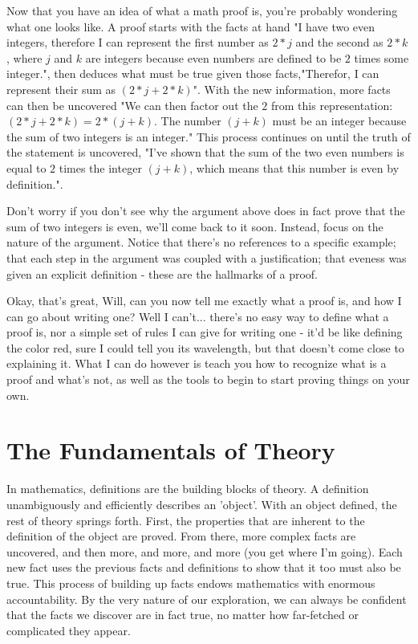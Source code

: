 \documentclass[a4paper,12pt]{article}
\begin{document}
Now that you have an idea of what a math proof is, you're probably wondering what one looks like. A proof starts with the facts at hand "I have two even integers, therefore I can represent the first number as  $2*j$ and the second as $2*k$, where $j$ and $k$ are integers because even numbers are defined to be $2$ times some integer.", then deduces what must be true given those facts,"Therefor, I can represent their sum as $(2*j + 2*k)$". With the new information, more facts can then be uncovered "We can then factor out the $2$ from this representation:  $(2*j + 2*k) = 2*(j + k)$. The number $(j + k)$ must be an integer because the sum of two integers is an integer." This process continues on until the truth of the statement is uncovered, "I've shown that the sum of the two even numbers is equal to $2$ times the integer $(j + k)$, which means that this number is even by definition.". 

Don't worry if you don't see why the argument above does in fact prove that the sum of two integers is even, we'll come back to it soon. Instead, focus on the nature of the argument. Notice that there's no references to a specific example; that each step in the argument was coupled with a justification; that eveness was given an explicit definition - these are the hallmarks of a proof. 

Okay, that's great, Will, can you now tell me exactly what a proof is, and how I can go about writing one? Well I can't... there's no easy way to define what a proof is, nor a simple set of rules I can give for writing one - it'd be like defining the color red, sure I could tell you its wavelength, but that doesn't come close to explaining it. What I can do however is teach you how to recognize what is a proof and what's not, as well as the tools to begin to start proving things on your own.

\section{The Fundamentals of Theory}
In mathematics, definitions are the building blocks of theory. A definition unambiguously and efficiently describes an 'object'. With an object defined, the rest of theory springs forth. First, the properties that are inherent to the definition of the object are proved. From there, more complex facts are uncovered, and then more, and more, and more (you get where I'm going). Each new fact uses the previous facts and definitions to show that it too must also be true. This process of building up facts endows mathematics with enormous accountability. By the very nature of our exploration, we can always be confident that the facts we discover are in fact true, no matter how far-fetched or complicated they appear. 
\end{document}
